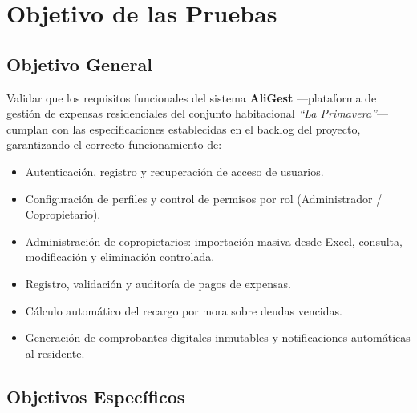 \documentclass[12pt,a4paper]{article}
\begin{document}
\setcounter{page}{2}

\renewcommand{\contentsname}{Índice de Contenidos}
\tableofcontents
\clearpage

\listoftables
\clearpage

\setcounter{page}{1}

\section{Objetivo de las Pruebas}

\subsection{Objetivo General}

Validar que los requisitos funcionales del sistema \textbf{AliGest} —plataforma de
gestión de expensas residenciales del conjunto habitacional \emph{``La Primavera''}—
cumplan con las especificaciones establecidas en el backlog del proyecto,
garantizando el correcto funcionamiento de:

\begin{itemize}[nosep]
    \item Autenticación, registro y recuperación de acceso de usuarios.
    \item Configuración de perfiles y control de permisos por rol (Administrador / Copropietario).
    \item Administración de copropietarios: importación masiva desde Excel, consulta, modificación y eliminación controlada.
    \item Registro, validación y auditoría de pagos de expensas.
    \item Cálculo automático del recargo por mora sobre deudas vencidas.
    \item Generación de comprobantes digitales inmutables y notificaciones automáticas al residente.
\end{itemize}

\subsection{Objetivos Específicos}
\end{document}
